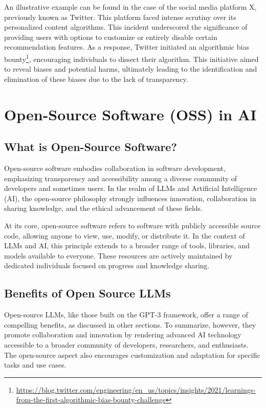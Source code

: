 \documentclass[
]{book}
\begin{document}
An illustrative example can be found in the case of the social media platform X, previously known as Twitter. This platform faced intense scrutiny over its personalized content algorithms. This incident underscored the significance of providing users with options to customize or entirely disable certain recommendation features. As a response, Twitter initiated an algorithmic bias bounty\footnote{\url{https://blog.twitter.com/engineering/en_us/topics/insights/2021/learnings-from-the-first-algorithmic-bias-bounty-challenge}}, encouraging individuals to dissect their algorithm. This initiative aimed to reveal biases and potential harms, ultimately leading to the identification and elimination of these biases due to the lack of transparency.

\hypertarget{open-source-software-oss-in-ai}{%
\chapter{Open-Source Software (OSS) in AI}\label{open-source-software-oss-in-ai}}

\hypertarget{what-is-open-source-software}{%
\section{What is Open-Source Software?}\label{what-is-open-source-software}}

Open-source software embodies collaboration in software development, emphasizing transparency and accessibility among a diverse community of developers and sometimes users. In the realm of LLMs and Artificial Intelligence (AI), the open-source philosophy strongly influences innovation, collaboration in sharing knowledge, and the ethical advancement of these fields.

At its core, open-source software refers to software with publicly accessible source code, allowing anyone to view, use, modify, or distribute it. In the context of LLMs and AI, this principle extends to a broader range of tools, libraries, and models available to everyone. These resources are actively maintained by dedicated individuals focused on progress and knowledge sharing.

\hypertarget{benefits-of-open-source-llms}{%
\section{Benefits of Open Source LLMs}\label{benefits-of-open-source-llms}}

Open-source LLMs, like those built on the GPT-3 framework, offer a range of compelling benefits, as discussed in other sections. To summarize, however, they promote collaboration and innovation by rendering advanced AI technology accessible to a broader community of developers, researchers, and enthusiasts. The open-source aspect also encourages customization and adaptation for specific tasks and use cases.
\end{document}
